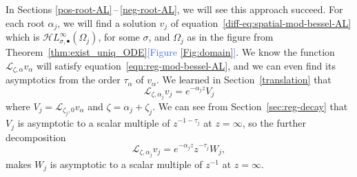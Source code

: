 \documentclass{article}
\newcommand{\singexp}[2]{\mathcal{H}L^\infty_{#1, #2}}
\newcommand{\singexpalg}[1]{\singexp{#1}{\bullet}}
\newcommand{\fracderiv}[3]{\partial^{#1}_{#2, #3}}
\newcommand{\laplace}{\mathcal{L}}
\theoremstyle{definition}
\theoremstyle{plain}
\begin{document}
In Sections \ref{pos-root-AL}\,--\,\ref{neg-root-AL}, we will see this approach succeed. For each root $\alpha_j$, we will find a solution $v_j$ of equation~\eqref{diff-eq:spatial-mod-bessel-AL} which is $\singexpalg{\sigma}(\Omega_j)$, for some $\sigma$, and $\Omega_j$ as in the figure from Theorem~\ref{thm:exist_uniq_ODE}\textcolor{RoyalBlue}{[Figure \ref{Fig:domain}]}. We know the function $\laplace_{\zeta, \alpha} v_\alpha$ will satisfy equation~\eqref{eqn:reg-mod-bessel-AL}, and we can even find its asymptotics from the order $\tau_\alpha$ of $v_\alpha$. We learned in Section~\ref{translation} that
\[ \laplace_{\zeta, \alpha_j} v_j = e^{-\alpha_j z} V_j \]
where $V_j = \laplace_{\zeta_j, 0} v_\alpha$ and $\zeta = \alpha_j + \zeta_j$. We can see from Section~\ref{sec:reg-decay} that $V_j$ is asymptotic to a scalar multiple of $z^{-1 - \tau_j}$ at $z = \infty$, so the further decomposition
\[ \laplace_{\zeta, \alpha_j} v_j = e^{-\alpha_j z} z^{-\tau_j} W_j, \]
makes $W_j$ is asymptotic to a scalar multiple of $z^{-1}$ at $z = \infty$.
\end{document}
